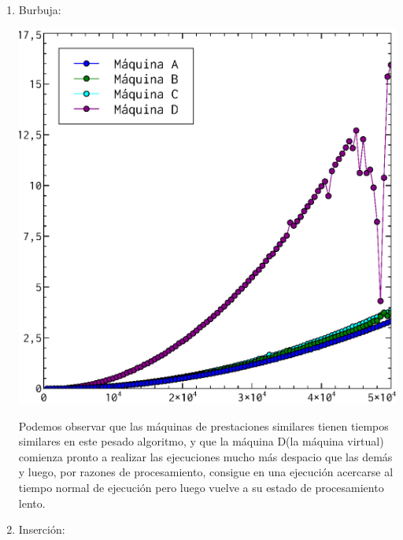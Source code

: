 \documentclass[a4paper, 11pt]{article}
\begin{document}
\begin{enumerate}
  \item Burbuja:\\
    \begin{center}
      \includegraphics[scale=0.5]{burbuja_todos.eps}\\
    \end{center}
    Podemos observar que las máquinas de prestaciones similares tienen tiempos similares en este pesado algoritmo, y que la máquina D(la máquina virtual) comienza pronto a realizar las ejecuciones mucho más despacio que las demás y luego, por razones de procesamiento, consigue en una ejecución acercarse al tiempo normal de ejecución pero luego vuelve a su estado de procesamiento lento.
  \item Inserción:\\
    \begin{center}

\end{center}
\end{enumerate}
\end{document}
